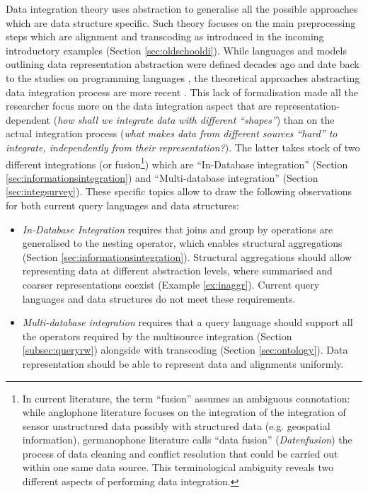 Data integration theory uses abstraction to generalise all the possible approaches which are data structure specific. Such theory focuses on the main preprocessing steps which are alignment and transcoding as introduced in the incoming introductory examples (Section \ref{sec:oldschooldi}). While languages and models outlining data representation abstraction were defined decades ago and date back to the studies on programming languages \cite{omg96,TPLPierce}, the theoretical approaches abstracting data integration process are more recent \cite{Lenzerini02,DeGiacomo2018}. This lack of formalisation made all the researcher focus more on the data integration aspect that are representation-dependent (\textit{how shall we integrate data with different ``shapes''}) than on the actual integration process (\textit{what makes data from different sources ``hard'' to integrate, independently from their representation?}). The latter takes stock of two different integrations (or fusion\footnote{In current literature, the term ``fusion'' assumes an ambiguous connotation: while anglophone literature \cite{Hall97,KHALEGHI201328} focuses on the integration of the integration of sensor unstructured data possibly with structured data (e.g. geospatial information), germanophone literature \cite{deII,Bleiholder09} calls ``data fusion'' (\textit{Datenfusion}) the process of data cleaning and conflict resolution that could be carried out within one same data source. This terminological ambiguity reveals two different aspects of performing data integration.}) which are ``In-Database integration'' (Section \ref{sec:informationsintegration}) and ``Multi-database integration'' (Section \ref{sec:integsurvey}). These specific topics allow to draw the following observations for both current query languages and data structures:
\begin{itemize}
\item  \textit{In-Database Integration} requires that joins and group by operations are generalised to the nesting operator, which enables structural aggregations (Section \ref{sec:informationsintegration}). Structural aggregations should allow representing data at different abstraction levels, where summarised and coarser representations coexist (Example \vref{ex:inaggr}). Current query languages and data structures do not meet these requirements.
\item \textit{Multi-database integration} requires that a query language should support all the operators required by the multisource integration (Section \ref{subsec:queryrw}) alongside with transcoding (Section \ref{sec:ontology}). Data representation should be able to represent data and alignments uniformly.
\end{itemize}




